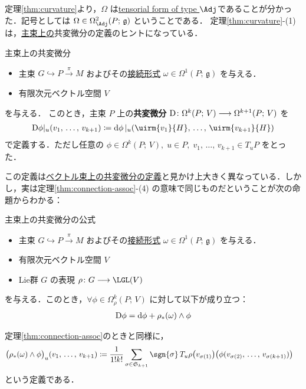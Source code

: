 \documentclass[geometry_main]{subfiles}
\begin{document}
定理\ref{thm:curvature}より，$\Omega$ は\hyperref[def:tensorial-form]{tensorial form of type $\Adj$}であることが分かった．記号としては $\Omega \in \Omega^2_{\Adj} (P;\, \mathfrak{g})$ ということである．
定理\ref{thm:curvature}-(1) は，\underline{主束上の}共変微分の定義のヒントになっている．

\begin{mydef}[label=def:codv-pbun]{主束上の共変微分}
    \begin{itemize}
        \item 主束 $G \hookrightarrow P \xrightarrow{\pi} M$ およびその\hyperref[def:connection]{接続形式} $\omega \in \Omega^1(P;\, \mathfrak{g})$ を与える．
        \item 有限次元ベクトル空間 $V$
    \end{itemize}
    を与える．
    このとき，主束 $P$ 上の\textbf{共変微分} $\mathrm{D}\colon \Omega^k (P;\, V) \longrightarrow \Omega^{k+1}(P;\, V)$ を
    \begin{align}
        \codd{\phi}|_u (v_1,\, \dots,\, v_{k+1}) \coloneqq \dd{\phi}|_u (\uirm{v_1}{H},\, \dots,\, \uirm{v_{k+1}}{H})
    \end{align}
    で定義する．ただし任意の $\phi \in \Omega^k (P;\, V),\; u \in P,\; v_1,\, \dots,\, v_{k+1} \in T_u P$ をとった．
\end{mydef}

この定義は\hyperref[def:connection-vect]{ベクトル束上の共変微分の定義}と見かけ上大きく異なっている．しかし，実は定理\ref{thm:connection-assoc}-(4) の意味で同じものだということが次の命題からわかる：

\begin{myprop}[label=prop:codv-pbun]{主束上の共変微分の公式}
    \begin{itemize}
        \item 主束 $G \hookrightarrow P \xrightarrow{\pi} M$ およびその\hyperref[def:connection]{接続形式} $\omega \in \Omega^1(P;\, \mathfrak{g})$ を与える．
        \item 有限次元ベクトル空間 $V$ 
        \item Lie群 $G$ の表現 $\rho \colon G \lto \LGL(V)$
    \end{itemize}
    を与える．このとき，$\forall \phi \in \Omega^k_\rho (P;\, V)$ に対して以下が成り立つ：
    \begin{align}
        \mathrm{D}\phi = \dd{\phi} + \rho_* (\omega) \wedge \phi
    \end{align}
\end{myprop}

\begin{marker}
    定理\ref{thm:connection-assoc}のときと同様に，
    \begin{align}
        \label{eq:codv-pbun}
        \bigl(\rho_* (\omega) \wedge \phi\bigr)_u (v_1,\, \dots,\, v_{k+1})
        &\coloneqq \frac{1}{1! k!} \sum_{\sigma \in \mathfrak{S}_{k+1}} \sgn{\sigma}\, T_u \rho \bigl( v_{\sigma(1)} \bigr) \bigl( \phi(v_{\sigma(2)},\, \dots,\, v_{\sigma(k+1)}) \bigr) 
    \end{align}
    という定義である．
\end{marker}
\end{document}
